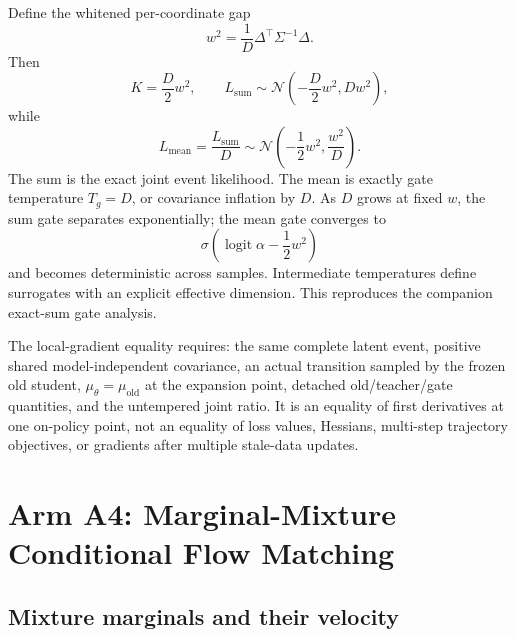 \documentclass[11pt,a4paper]{article}
\newcommand{\N}{\mathcal{N}}
\DeclareMathOperator{\logit}{logit}
\theoremstyle{plain}
\theoremstyle{definition}
\begin{document}
Define the whitened per-coordinate gap
\begin{equation}
w^2
=
\frac1D
\Delta^\top\Sigma^{-1}\Delta .
\label{eq:a3-whitened-rms}
\end{equation}
Then
\begin{equation}
K=\frac{D}{2}w^2,
\qquad
L_{\mathrm{sum}}
\sim
\N\!\left(-\frac{D}{2}w^2,Dw^2\right),
\label{eq:a3-sum-law}
\end{equation}
while
\begin{equation}
L_{\mathrm{mean}}
=\frac{L_{\mathrm{sum}}}{D}
\sim
\N\!\left(-\frac12w^2,\frac{w^2}{D}\right).
\label{eq:a3-mean-law}
\end{equation}
The sum is the exact joint event likelihood.  The mean is exactly gate temperature $T_g=D$, or
covariance inflation by $D$.  As $D$ grows at fixed $w$, the sum gate separates exponentially;
the mean gate converges to
\begin{equation}
\sigma\!\left(\logit\alpha-\frac12w^2\right)
\label{eq:a3-mean-limit}
\end{equation}
and becomes deterministic across samples.  Intermediate temperatures define surrogates with an
explicit effective dimension.  This reproduces the companion exact-sum gate analysis.

\begin{tcolorbox}[colback=red!4,colframe=red!45!black,title=Exact boundary of Arm A3]
The local-gradient equality requires: the same complete latent event, positive shared
model-independent covariance, an actual transition sampled by the frozen old student,
$\mu_\theta=\mu_{\mathrm{old}}$ at the expansion point, detached old/teacher/gate quantities, and
the untempered joint ratio.  It is an equality of first derivatives at one on-policy point, not
an equality of loss values, Hessians, multi-step trajectory objectives, or gradients after
multiple stale-data updates.
\end{tcolorbox}

\section{Arm A4: Marginal-Mixture Conditional Flow Matching}
\label{sec:a4}

\subsection{Mixture marginals and their velocity}
\end{document}
